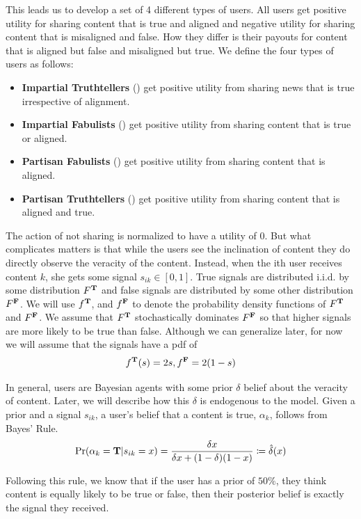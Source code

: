 This leads us to develop a set of 4 different types of users. All users get positive utility for sharing content that is true and aligned and negative utility for sharing content that is misaligned and false. How they differ is their payouts for content that is aligned but false and misaligned but true. We define the four types of users as follows: 
\begin{itemize}
    \item \textbf{Impartial Truthtellers} (\IT) get positive utility from sharing news that is true irrespective of alignment. 
    \item \textbf{Impartial Fabulists} (\IF) get positive utility from sharing content that is true or aligned. 
    \item \textbf{Partisan Fabulists} (\PF) get positive utility from sharing content that is aligned. 
    \item \textbf{Partisan Truthtellers} (\PT) get positive utility from sharing content that is aligned and true. 
\end{itemize}


The action of not sharing is normalized to have a utility of 0. But what complicates matters is that while the users see the inclination of content they do directly observe the veracity of the content. Instead, when the ith user receives content $k$, she gets some signal $s_{ik} \in [0,1]$. True signals are distributed i.i.d. by some distribution $F^{\mathbf{T}}$ and false signals are distributed by some other distribution $F^{\mathbf{F}}$. We will use $f^{\mathbf{T}}$, and $f^{\mathbf{F}}$ to denote the probability density functions of $F^{\mathbf{T}}$ and  $F^{\mathbf{F}}$. We assume that $F^{\mathbf{T}}$ stochastically dominates $F^{\mathbf{F}}$ so that higher signals are more likely to be true than false.  Although we can generalize later, for now we will assume that the signals have a pdf of 
\[
f^{\mathbf{T}}(s) = 2s , f^{\mathbf{F}} = 2(1-s)
\]

In general, users are Bayesian agents with some prior $\delta$ belief about the veracity of content. Later, we will describe how this $\delta$ is endogenous to the model. Given a prior and a signal $s_{ik}$, a user's belief that a content is true, $\alpha_k$, follows from Bayes' Rule. 
\begin{equation}
    \Pr(\alpha_k = \mathbf{T} | s_{ik} = x ) = \frac{\delta x}{ \delta x + (1-\delta) (1-x) }\coloneqq \hat{\delta}(x)
\end{equation}

Following this rule, we know that if the user has a prior of $50\%$, they think content is equally likely to be true or false, then their posterior belief is exactly the signal they received. 
